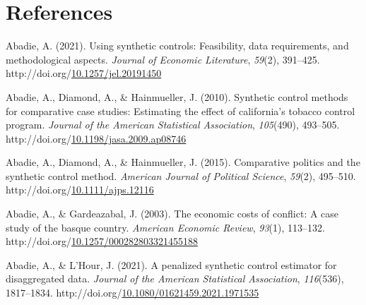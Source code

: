 \documentclass[12pt,nobind, a4paper]{reedthesis}
\newlength{\cslhangindent}
\newenvironment{CSLReferences}[2] %
{%
	\setlength{\parindent}{0pt}
	\ifodd #1 \everypar{\setlength{\hangindent}{\cslhangindent}}\ignorespaces\fi
	\ifnum #2 > 0
	\setlength{\parskip}{#2\baselineskip}
	\fi
}%
{}
\begin{document}
 \backmatter

 \hypertarget{references}{%
 \chapter*{References}\label{references}}


 \noindent

 \setlength{\parindent}{-0.20in}

 \hypertarget{refs}{}
 \begin{CSLReferences}{1}{0}
 \leavevmode{}%
 Abadie, A. (2021). Using synthetic controls: Feasibility, data requirements, and methodological aspects. \emph{Journal of Economic Literature}, \emph{59}(2), 391--425. http://doi.org/\href{https://doi.org/10.1257/jel.20191450}{10.1257/jel.20191450}

 \leavevmode{}%
 Abadie, A., Diamond, A., \& Hainmueller, J. (2010). Synthetic control methods for comparative case studies: Estimating the effect of california's tobacco control program. \emph{Journal of the American Statistical Association}, \emph{105}(490), 493--505. http://doi.org/\href{https://doi.org/10.1198/jasa.2009.ap08746}{10.1198/jasa.2009.ap08746}

 \leavevmode{}%
 Abadie, A., Diamond, A., \& Hainmueller, J. (2015). Comparative politics and the synthetic control method. \emph{American Journal of Political Science}, \emph{59}(2), 495--510. http://doi.org/\href{https://doi.org/10.1111/ajps.12116}{10.1111/ajps.12116}

 \leavevmode{}%
 Abadie, A., \& Gardeazabal, J. (2003). The economic costs of conflict: A case study of the basque country. \emph{American Economic Review}, \emph{93}(1), 113--132. http://doi.org/\href{https://doi.org/10.1257/000282803321455188}{10.1257/000282803321455188}

 \leavevmode{}%
 Abadie, A., \& L'Hour, J. (2021). A penalized synthetic control estimator for disaggregated data. \emph{Journal of the American Statistical Association}, \emph{116}(536), 1817--1834. http://doi.org/\href{https://doi.org/10.1080/01621459.2021.1971535}{10.1080/01621459.2021.1971535}


\end{CSLReferences}
\end{document}
